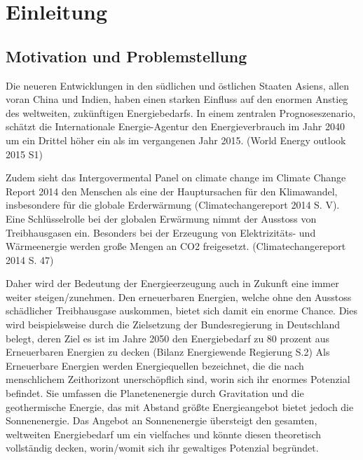 \renewcommand{\chapterheadstartvskip}{\vspace*{2cm}}

\chapter{Einleitung}
\label{chap:einleitung}
\setcounter{page}{1}
\renewcommand{\chapterheadstartvskip}{\vspace*{-1cm}}


\section{Motivation und Problemstellung}
\label{sec:motivation}

Die neueren Entwicklungen in den südlichen und östlichen Staaten Asiens, allen voran China und Indien, haben einen starken Einfluss auf den enormen Anstieg des weltweiten, zukünftigen Energiebedarfs. In einem zentralen Prognoseszenario, schätzt die Internationale Energie-Agentur den Energieverbrauch im Jahr 2040 um ein Drittel höher ein als im vergangenen Jahr 2015.  (World Energy outlook 2015 S1)

Zudem sieht das Intergovermental Panel on climate change im Climate Change Report 2014 den Menschen als eine der Hauptursachen für den Klimawandel, insbesondere für die globale Erderwärmung (Climatechangereport 2014 S. V). Eine Schlüsselrolle bei der globalen Erwärmung nimmt der Ausstoss von Treibhausgasen ein. Besonders bei der Erzeugung von Elektrizitäts- und Wärmeenergie werden große Mengen an CO2 freigesetzt.
(Climatechangereport 2014 S. 47)

Daher wird der Bedeutung der Energieerzeugung auch in Zukunft eine immer weiter steigen/zunehmen. Den erneuerbaren Energien, welche ohne den Ausstoss schädlicher Treibhausgase auskommen, bietet sich damit ein enorme Chance. Dies wird beispielsweise durch die Zielsetzung der Bundesregierung in Deutschland belegt, deren Ziel es ist im Jahre 2050 den Energiebedarf zu 80 prozent aus Erneuerbaren Energien zu decken (Bilanz Energiewende Regierung S.2)
Als Erneuerbare Energien werden Energiequellen bezeichnet, die die nach menschlichem Zeithorizont unerschöpflich sind, worin sich ihr enormes Potenzial befindet. Sie umfassen die Planetenenergie durch Gravitation und die geothermische Energie, das mit Abstand größte Energieangebot bietet jedoch die Sonnenenergie.
Das Angebot an Sonnenenergie übersteigt den gesamten, weltweiten Energiebedarf um ein vielfaches und könnte diesen theoretisch vollständig decken, worin/womit sich ihr gewaltiges Potenzial begründet.

